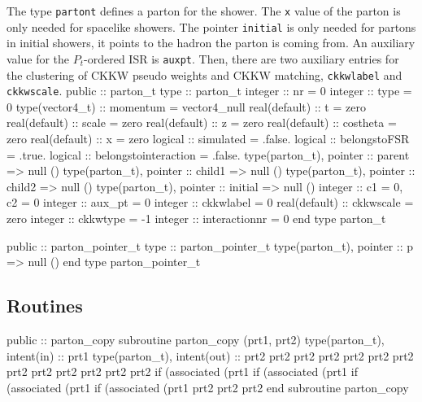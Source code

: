 The type {\tt{}parton{}t} defines a parton for the shower. The {\tt{}x} value
of the parton is only needed for spacelike showers. The pointer
{\tt{}initial} is only needed for partons in initial showers, it points to
the hadron the parton is coming from. An auxiliary value for the
$P_t$-ordered ISR is {\tt{}aux{}pt}. Then, there are two auxiliary entries
for the clustering of CKKW pseudo weights and CKKW matching,
{\tt{}ckkwlabel} and {\tt{}ckkwscale}.
\nwenddocs{}\endmoddef
  public :: parton_t
\nwendcode{}\endmoddef
  type :: parton_t
     integer :: nr = 0
     integer :: type = 0
     type(vector4_t) :: momentum = vector4_null
     real(default) :: t  = zero
     real(default) :: scale = zero
     real(default) :: z = zero
     real(default) :: costheta = zero
     real(default) :: x = zero
     logical :: simulated = .false.
     logical :: belongstoFSR = .true.
     logical :: belongstointeraction = .false.
     type(parton_t), pointer :: parent => null ()
     type(parton_t), pointer :: child1 => null ()
     type(parton_t), pointer :: child2 => null ()
     type(parton_t), pointer :: initial => null ()
     integer :: c1 = 0, c2 = 0
     integer :: aux_pt = 0
     integer :: ckkwlabel = 0
     real(default) :: ckkwscale = zero
     integer :: ckkwtype = -1
     integer :: interactionnr = 0
  end type parton_t

\eatline
\nwendcode{}\nwdocspar
\nwenddocs{}\plusendmoddef
  public :: parton_pointer_t
\nwendcode{}\plusendmoddef
  type :: parton_pointer_t
     type(parton_t), pointer :: p => null ()
  end type parton_pointer_t

\eatline
\nwendcode{}\nwdocspar
\subsection{Routines}
\nwenddocs{}\plusendmoddef
  public :: parton_copy
\nwendcode{}\endmoddef
  subroutine parton_copy (prt1, prt2)
    type(parton_t), intent(in) :: prt1
    type(parton_t), intent(out) :: prt2
    prt2%
    prt2%
    prt2%
    prt2%
    prt2%
    prt2%
    prt2%
    prt2%
    prt2%
    prt2%
    prt2%
    prt2%
    if (associated (prt1%
    if (associated (prt1%
    if (associated (prt1%
    if (associated (prt1%
    prt2%
    prt2%
    prt2%
  end subroutine parton_copy

